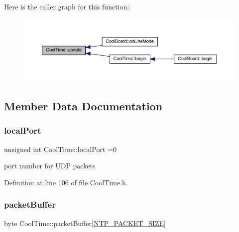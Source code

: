 Here is the caller graph for this function\+:\nopagebreak
\begin{figure}[H]
\begin{center}
\leavevmode
\includegraphics[width=350pt]{d6/d49/class_cool_time_aae601f795452cfa48d9fb337aed483a8_icgraph}
\end{center}
\end{figure}


\subsection{Member Data Documentation}
\mbox{\label{class_cool_time_a2f777da44d7ba678be8185299e9b49d1}} 
\subsubsection{\texorpdfstring{local\+Port}{localPort}}
{\footnotesize\ttfamily unsigned int Cool\+Time\+::local\+Port =0\hspace{0.3cm}{\ttfamily [private]}}

port number for U\+DP packets 

Definition at line 106 of file Cool\+Time.\+h.

\mbox{\label{class_cool_time_a27e6abc82a5c2f72161956967005bec7}} 
\subsubsection{\texorpdfstring{packet\+Buffer}{packetBuffer}}
{\footnotesize\ttfamily byte Cool\+Time\+::packet\+Buffer\mbox{[}\hyperlink{_cool_time_8h_a56a6ea64006651b4f42adf713e244f06}{N\+T\+P\+\_\+\+P\+A\+C\+K\+E\+T\+\_\+\+S\+I\+ZE}\mbox{]}\hspace{0.3cm}{\ttfamily [private]}}

